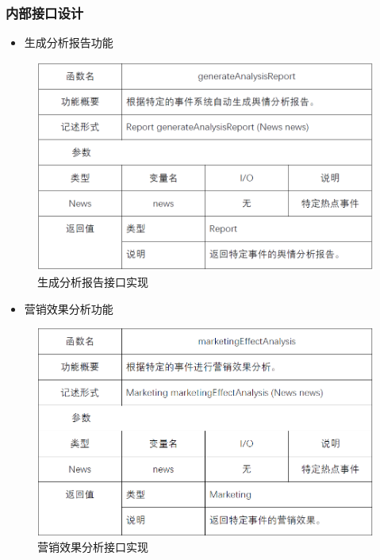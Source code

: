 \subsubsection{内部接口设计}
\begin{itemize}
	\item 生成分析报告功能
\end{itemize}
\begin{figure}[!htbp]
	\centering
	\includegraphics[scale=0.75]{image/b28.png} %
	\caption{生成分析报告接口实现} %
\end{figure}
\begin{itemize}
	\item 营销效果分析功能
\end{itemize}
\begin{figure}[!htbp]
	\centering
	\includegraphics[scale=0.75]{image/b23.png} %
	\caption{营销效果分析接口实现} %
\end{figure}
